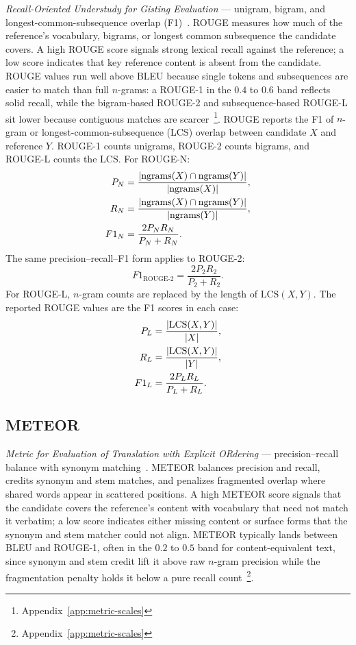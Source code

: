 \emph{Recall-Oriented Understudy for Gisting Evaluation} --- unigram, bigram, and longest-common-subsequence overlap (F1)~\cite{Lin2004}. ROUGE measures how much of the reference's vocabulary, bigrams, or longest common subsequence the candidate covers. A high ROUGE score signals strong lexical recall against the reference; a low score indicates that key reference content is absent from the candidate. ROUGE values run well above BLEU because single tokens and subsequences are easier to match than full $n$-grams: a ROUGE-1 in the $0.4$ to $0.6$ band reflects solid recall, while the bigram-based ROUGE-2 and subsequence-based ROUGE-L sit lower because contiguous matches are scarcer~\footnote{Appendix~\ref{app:metric-scales}}.
ROUGE reports the F1 of $n$-gram or longest-common-subsequence (LCS) overlap between candidate $X$ and reference $Y$. ROUGE-1 counts unigrams, ROUGE-2 counts bigrams, and ROUGE-L counts the LCS. For ROUGE-N:
\begin{align}
P_N &= \frac{|\mathrm{ngrams}(X) \cap \mathrm{ngrams}(Y)|}{|\mathrm{ngrams}(X)|}, \notag \\
R_N &= \frac{|\mathrm{ngrams}(X) \cap \mathrm{ngrams}(Y)|}{|\mathrm{ngrams}(Y)|}, \notag \\
F1_N &= \frac{2 P_N R_N}{P_N + R_N}. \label{eq:rouge1}
\end{align}
The same precision–recall–F1 form applies to ROUGE-2:
\begin{equation}
\label{eq:rouge2}
F1_{\text{ROUGE-2}} = \frac{2 P_2 R_2}{P_2 + R_2}.
\end{equation}
For ROUGE-L, $n$-gram counts are replaced by the length of $\mathrm{LCS}(X, Y)$. The reported ROUGE values are the F1 scores in each case:
\begin{align}
P_L &= \frac{|\mathrm{LCS}(X, Y)|}{|X|}, \notag \\
R_L &= \frac{|\mathrm{LCS}(X, Y)|}{|Y|}, \notag \\
F1_L &= \frac{2 P_L R_L}{P_L + R_L}. \label{eq:rougeL}
\end{align}

\subsection{METEOR}

\emph{Metric for Evaluation of Translation with Explicit ORdering} --- precision--recall balance with synonym matching~\cite{Banerjee2005}. METEOR balances precision and recall, credits synonym and stem matches, and penalizes fragmented overlap where shared words appear in scattered positions. A high METEOR score signals that the candidate covers the reference's content with vocabulary that need not match it verbatim; a low score indicates either missing content or surface forms that the synonym and stem matcher could not align. METEOR typically lands between BLEU and ROUGE-1, often in the $0.2$ to $0.5$ band for content-equivalent text, since synonym and stem credit lift it above raw $n$-gram precision while the fragmentation penalty holds it below a pure recall count~\footnote{Appendix~\ref{app:metric-scales}}.

